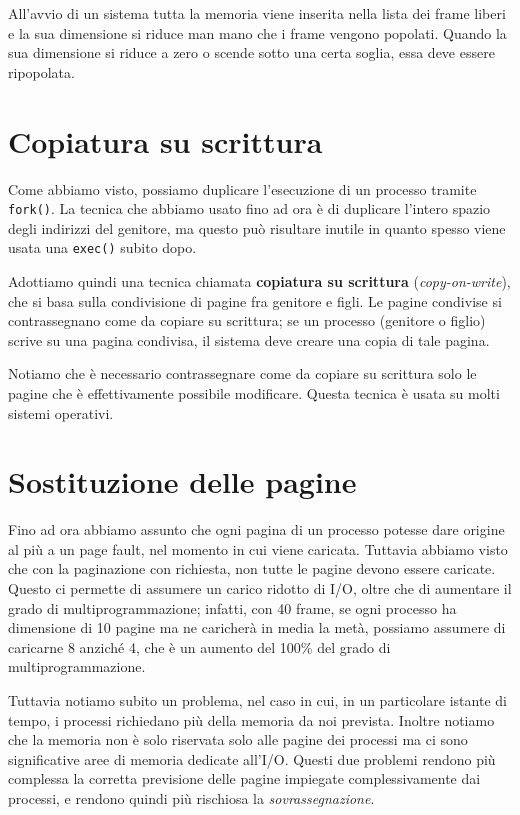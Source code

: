         All'avvio di un sistema tutta la memoria viene inserita nella lista dei frame liberi e la sua dimensione si riduce man mano che i frame vengono popolati. Quando la sua dimensione si riduce a zero o scende sotto una certa soglia, essa deve essere ripopolata.
        
\section{Copiatura su scrittura}
    Come abbiamo visto, possiamo duplicare l'esecuzione di un processo tramite \texttt{fork()}. La tecnica che abbiamo usato fino ad ora è di duplicare l'intero spazio degli indirizzi del genitore, ma questo può risultare inutile in quanto spesso viene usata una \texttt{exec()} subito dopo.
    
    Adottiamo quindi una tecnica chiamata \textbf{copiatura su scrittura} (\textit{copy-on-write}), che si basa sulla condivisione di pagine fra genitore e figli. Le pagine condivise si contrassegnano come da copiare su scrittura; se un processo (genitore o figlio) scrive su una pagina condivisa, il sistema deve creare una copia di tale pagina.
    
    Notiamo che è necessario contrassegnare come da copiare su scrittura solo le pagine che è effettivamente possibile modificare. Questa tecnica è usata su molti sistemi operativi.
    
\section{Sostituzione delle pagine}
    Fino ad ora abbiamo assunto che ogni pagina di un processo potesse dare origine al più a un page fault, nel momento in cui viene caricata. Tuttavia abbiamo visto che con la paginazione con richiesta, non tutte le pagine devono essere caricate. Questo ci permette di assumere un carico ridotto di I/O, oltre che di aumentare il grado di multiprogrammazione; infatti, con 40 frame, se ogni processo ha dimensione di 10 pagine ma ne caricherà in media la metà, possiamo assumere di caricarne 8 anziché 4, che è un aumento del 100\% del grado di multiprogrammazione.
    
    Tuttavia notiamo subito un problema, nel caso in cui, in un particolare istante di tempo, i processi richiedano più della memoria da noi prevista. Inoltre notiamo che la memoria non è solo riservata solo alle pagine dei processi ma ci sono significative aree di memoria dedicate all'I/O. Questi due problemi rendono più complessa la corretta previsione delle pagine impiegate complessivamente dai processi, e rendono quindi più rischiosa la \textit{sovrassegnazione}.
    
